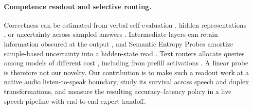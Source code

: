 \paragraph{Competence readout and selective routing.}
Correctness can be estimated from verbal self-evaluation
\citep{kadavath2022language,lin2022teaching}, hidden representations
\citep{azaria2023internal,burns2023discovering,marks2024geometry}, or
uncertainty across sampled answers \citep{kuhn2023semantic,farquhar2024detecting}.
Intermediate layers can retain information obscured at the output
\citep{orgad2025llms,mahaut2024factual}, and Semantic Entropy Probes amortize
sample-based uncertainty into a hidden-state read \citep{kossen2024semantic}.
Text routers allocate queries among models of different cost
\citep{chen2023frugalgpt,ding2024hybrid,ong2024routellm}, including from
prefill activations \citep{varshney2026llmrouter,lugoloobi2026failures}.
A linear probe is therefore not our novelty. Our contribution is to make such a
readout work at a native audio listen-to-speak boundary, study its survival
across speech and duplex transformations, and measure the resulting
accuracy--latency policy in a live speech pipeline with end-to-end expert
handoff.
